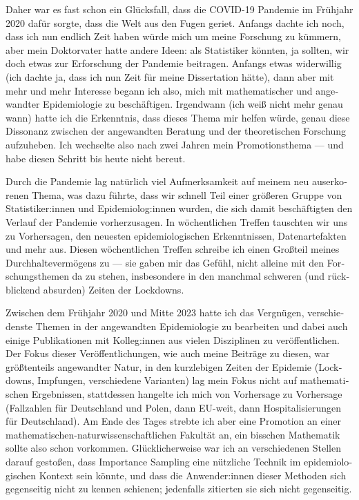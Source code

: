 \begin{otherlanguage}{ngerman}
Daher war es fast schon ein Glücksfall, dass die COVID-19 Pandemie im Frühjahr 2020 dafür sorgte, dass die Welt aus den Fugen geriet. Anfangs dachte ich noch, dass ich nun endlich Zeit haben würde mich um meine Forschung zu kümmern, aber mein Doktorvater hatte andere Ideen: als Statistiker könnten, ja sollten, wir doch etwas zur Erforschung der Pandemie beitragen. Anfangs etwas widerwillig (ich dachte ja, dass ich nun Zeit für meine Dissertation hätte), dann aber mit mehr und mehr Interesse begann ich also, mich mit mathematischer und angewandter Epidemiologie zu beschäftigen. Irgendwann (ich weiß nicht mehr genau wann) hatte ich die Erkenntnis, dass dieses Thema mir helfen würde, genau diese Dissonanz zwischen der angewandten Beratung und der theoretischen Forschung aufzuheben. Ich wechselte also nach zwei Jahren mein Promotionsthema --- und habe diesen Schritt bis heute nicht bereut. 

Durch die Pandemie lag natürlich viel Aufmerksamkeit auf meinem neu auserkorenen Thema, was dazu führte, dass wir schnell Teil einer größeren Gruppe von Statistiker:innen und Epidemiolog:innen wurden, die sich damit beschäftigten den Verlauf der Pandemie vorherzusagen. In wöchentlichen Treffen tauschten wir uns zu Vorhersagen, den neuesten epidemiologischen Erkenntnissen, Datenartefakten und mehr aus. Diesen wöchentlichen Treffen schreibe ich einen Großteil meines Durchhaltevermögens zu --- sie gaben mir das Gefühl, nicht alleine mit den Forschungsthemen da zu stehen, insbesondere in den manchmal schweren (und rückblickend absurden) Zeiten der Lockdowns. 

Zwischen dem Frühjahr 2020 und Mitte 2023 hatte ich das Vergnügen, verschiedenste Themen in der angewandten Epidemiologie zu bearbeiten und dabei auch einige Publikationen mit Kolleg:innen aus vielen Disziplinen zu veröffentlichen. Der Fokus dieser Veröffentlichungen, wie auch meine Beiträge zu diesen, war größtenteils angewandter Natur, in den kurzlebigen Zeiten der Epidemie (Lockdowns, Impfungen, verschiedene Varianten) lag mein Fokus nicht auf mathematischen Ergebnissen, stattdessen hangelte ich mich von Vorhersage zu Vorhersage (Fallzahlen für Deutschland und Polen, dann EU-weit, dann Hospitalisierungen für Deutschland). Am Ende des Tages strebte ich aber eine Promotion an einer mathematischen-naturwissenschaftlichen Fakultät an, ein bisschen Mathematik sollte also schon vorkommen. Glücklicherweise war ich an verschiedenen Stellen darauf gestoßen, dass Importance Sampling eine nützliche Technik im epidemiologischen Kontext sein könnte, und dass die Anwender:innen dieser Methoden sich gegenseitig nicht zu kennen schienen; jedenfalls zitierten sie sich nicht gegenseitig. 


\end{otherlanguage}
